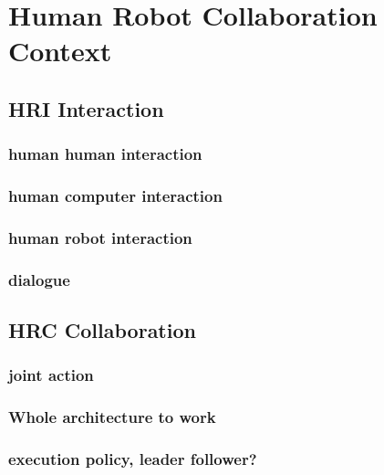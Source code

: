 \ifdefined{}
\else
\setcounter{chapter}{0}
\dominitoc
\faketableofcontents
\fi

\chapter{Human Robot Collaboration Context}
\label{chap:1}
\minitoc



\section{HRI Interaction}

\subsection{human human interaction}
\subsection{human computer interaction}
\subsection{human robot interaction}

\subsection{dialogue}


\section{HRC Collaboration}

\subsection{joint action}
\subsection{Whole architecture to work}
\subsection{execution policy, leader follower?}


